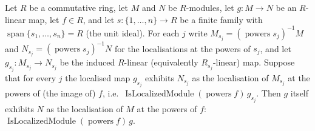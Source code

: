\begin{lemma}
  \label{mk-lem:isLocalizedModule_of_span_cover}

  Let \(R\) be a commutative ring, let \(M\) and \(N\) be \(R\)-modules, let
  \(g : M \to N\) be an \(R\)-linear map, let \(f \in R\), and let
  \(s : \{1, \ldots, n\} \to R\) be a finite family with
  \(\operatorname{span}\{s_1, \ldots, s_n\} = R\) (the unit ideal). For each \(j\) write
  \(M_{s_j} = (\operatorname{powers} s_j)^{-1} M\) and \(N_{s_j} = (\operatorname{powers}
  s_j)^{-1} N\) for the localisations at the powers of \(s_j\), and let
  \(g_{s_j} : M_{s_j} \to N_{s_j}\) be the induced \(R\)-linear (equivalently
  \(R_{s_j}\)-linear) map. Suppose that for every \(j\) the localised map \(g_{s_j}\)
  exhibits \(N_{s_j}\) as the localisation of \(M_{s_j}\) at the powers of (the image of)
  \(f\), i.e.\ \(\operatorname{IsLocalizedModule}(\operatorname{powers} f)\, g_{s_j}\). Then
  \(g\) itself exhibits \(N\) as the localisation of \(M\) at the powers of \(f\):
  \(\operatorname{IsLocalizedModule}(\operatorname{powers} f)\, g\).
\end{lemma}
